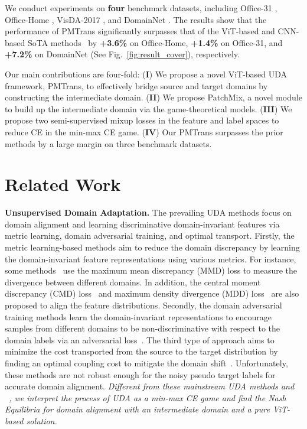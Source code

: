 \documentclass[10pt,twocolumn,letterpaper, ]{article}
\begin{document}
We conduct experiments on \textbf{four} benchmark datasets, including Office-31 \cite{SaenkoKFD10}, Office-Home \cite{VenkateswaraECP17}, VisDA-2017 \cite{abs-1710-06924}, and DomainNet \cite{PengBXHSW19}.
The results show that the performance of PMTrans significantly surpasses that of the ViT-based \cite{abs-2204-07683,abs-2109-06165,abs-2108-05988} and CNN-based SoTA methods~\cite{NaJCH21,LiXGLWL21,SharmaKC21} by \textbf{+3.6\%} on Office-Home, \textbf{+1.4\%} on Office-31, and \textbf{+7.2\%} on DomainNet (See Fig.~\ref{fig:result_cover}), respectively. 

Our main contributions are four-fold: (\textbf{I}) We propose a novel ViT-based UDA framework, PMTrans, to effectively bridge source and target domains by constructing the intermediate domain. (\textbf{II}) We propose PatchMix, a novel module to build up the intermediate domain via the game-theoretical models. (\textbf{III}) We propose two semi-supervised mixup losses in the feature and label spaces to reduce CE in the min-max CE game. (\textbf{IV}) Our PMTrans surpasses the prior methods by a large margin on three benchmark datasets. 



\vspace{-8pt}
\section{Related Work}
\vspace{-3pt}
\noindent \textbf{Unsupervised Domain Adaptation.}
The prevailing UDA methods focus on domain alignment and learning discriminative domain-invariant features via metric learning, domain adversarial training, and optimal transport. Firstly, the metric learning-based methods aim to reduce the domain discrepancy by learning the domain-invariant feature representations using various metrics. For instance, some methods~\cite{LongC0J15, LongZ0J17, ZhuZW19, Kang0YH19} use the maximum mean discrepancy (MMD) loss to measure the divergence between different domains. In addition, the central moment discrepancy (CMD) loss~\cite{ZellingerGLNS17} and maximum density divergence (MDD) loss~\cite{LiCDZLS21} are also proposed to align the feature distributions. Secondly, the domain adversarial training methods learn the domain-invariant representations to encourage samples from different domains to be non-discriminative with respect to the domain labels via an adversarial loss~\cite{GaninUAGLLML16, XuZNLWTZ20, WuIE20}.
The third type of approach aims to minimize the cost transported from the source to the target distribution by finding an optimal coupling cost to mitigate the domain shift~\cite{CourtyFTR17, CourtyFHR17}. Unfortunately, these methods are not robust enough for the noisy pseudo target labels for accurate domain alignment.\textit{ Different from these mainstream UDA methods and ~\cite{AcunaLZF22}, we interpret the process of UDA as a min-max CE game and find the Nash Equilibria for domain alignment with an intermediate domain and a pure ViT-based solution.}
\end{document}
